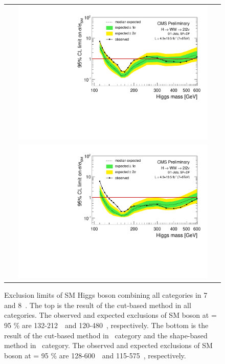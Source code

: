 \begin{figure}[htp] 
\centering 
\begin{tabular}{c} 
\includegraphics[width=0.9\textwidth]{figures/table_limits_nj_cut_78TeV_log.pdf} \\
\includegraphics[width=0.9\textwidth]{figures/table_limits_nj_78TeV_log.pdf} 
\end{tabular} 
\caption{Exclusion limits of SM Higgs boson combining all categories in 7 and 8~\TeV. 
The top is the result of the cut-based method in all categories.
The observed and expected exclusions of SM boson at \CLs = 95 \% are 
132-212~\GeV\ and 120-480~\GeV, respectively. 
The bottom is the result of the cut-based method in \SF\ category 
and the shape-based method in \DF\ category.
The observed and expected exclusions of SM boson at \CLs = 95 \% are 
128-600~\GeV\ and 115-575~\GeV, respectively.} 
\label{fig:limit78} 
\end{figure} 

